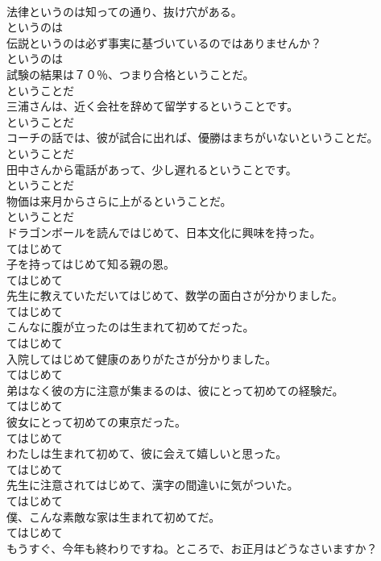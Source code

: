 \documentclass[8pt]{extreport}
\begin{document}
\begin{CJK}{UTF8}{min}
\\	法律というのは知っての通り、抜け穴がある。	
\\	というのは
\\	伝説というのは必ず事実に基づいているのではありませんか？	
\\	というのは
\\	試験の結果は７０％、つまり合格ということだ。	
\\	ということだ
\\	三浦さんは、近く会社を辞めて留学するということです。	
\\	ということだ
\\	コーチの話では、彼が試合に出れば、優勝はまちがいないということだ。	
\\	ということだ
\\	田中さんから電話があって、少し遅れるということです。	
\\	ということだ
\\	物価は来月からさらに上がるということだ。	
\\	ということだ
\\	ドラゴンボールを読んではじめて、日本文化に興味を持った。	
\\	てはじめて
\\	子を持ってはじめて知る親の恩。	
\\	てはじめて
\\	先生に教えていただいてはじめて、数学の面白さが分かりました。	
\\	てはじめて
\\	こんなに腹が立ったのは生まれて初めてだった。	
\\	てはじめて
\\	入院してはじめて健康のありがたさが分かりました。	
\\	てはじめて
\\	弟はなく彼の方に注意が集まるのは、彼にとって初めての経験だ。	
\\	てはじめて
\\	彼女にとって初めての東京だった。	
\\	てはじめて
\\	わたしは生まれて初めて、彼に会えて嬉しいと思った。	
\\	てはじめて
\\	先生に注意されてはじめて、漢字の間違いに気がついた。	
\\	てはじめて
\\	僕、こんな素敵な家は生まれて初めてだ。	
\\	てはじめて
\\	もうすぐ、今年も終わりですね。ところで、お正月はどうなさいますか？	

\end{CJK}
\end{document}
